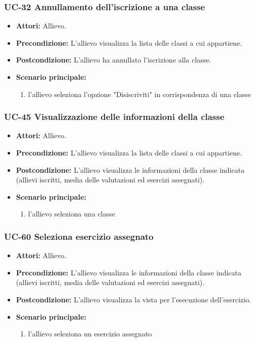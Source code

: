 	\subsubsection{UC-32 Annullamento dell'iscrizione a una classe}
		\begin{itemize}
			\item \textbf{Attori:} Allievo.
			\item \textbf{Precondizione:} L'allievo visualizza la lista delle classi a cui appartiene.
			\item \textbf{Postcondizione:} L'allievo ha annullato l'iscrizione alla classe.
			\item \textbf{Scenario principale:}
			\begin{enumerate}
				\item l'allievo seleziona l'opzione "Disiscriviti" in corrispondenza di una classe
			\end{enumerate}
		\end{itemize}					
				
	\subsubsection{UC-45 Visualizzazione delle informazioni della classe}
		\begin{itemize}
			\item \textbf{Attori:} Allievo.
			\item \textbf{Precondizione:} L'allievo visualizza la lista delle classi a cui appartiene.
			\item \textbf{Postcondizione:} L'allievo visualizza le informazioni della classe indicata (allievi iscritti, media delle valutazioni ed esercizi assegnati).
			\item \textbf{Scenario principale:}
			\begin{enumerate}
				\item l'allievo seleziona una classe
			\end{enumerate}
		\end{itemize}
\subsubsection{UC-60 Seleziona esercizio assegnato}
\begin{itemize}
			\item \textbf{Attori:} Allievo.
			\item \textbf{Precondizione:} L'allievo visualizza le informazioni della classe indicata (allievi iscritti, media delle valutazioni ed esercizi assegnati).
			\item \textbf{Postcondizione:} L'allievo visualizza la vista per l'esecuzione dell'esercizio.
			\item \textbf{Scenario principale:}
			\begin{enumerate}
				\item l'allievo seleziona un esercizio assegnato
			\end{enumerate}
		\end{itemize}
